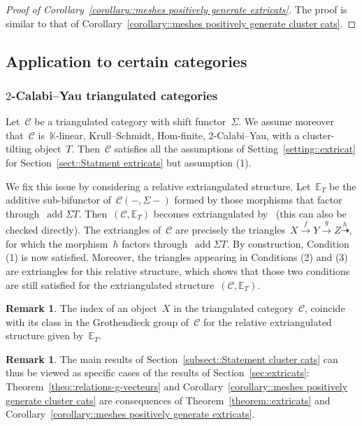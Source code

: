 \documentclass{amsart}
\theoremstyle{definition}
\newtheorem{remark}[theorem]{Remark}
\newcommand{\field}{\mathbb{K}}
\newcommand{\cat}{\mathcal{C}}
\newcommand{\susp}{\Sigma}
\newcommand{\add}{\operatorname{add}}
\begin{document}
\begin{proof}[Proof of Corollary~\ref{corollary::meshes positively generate extricats}]
The proof is similar to that of Corollary~\ref{corollary::meshes positively generate cluster cats}.
\end{proof}



\subsection{Application to certain categories}


\subsubsection{$2$-Calabi--Yau triangulated categories}
\label{sect::2CYTriangulated}

Let~$\cat$ be a triangulated category with shift functor~$\susp$.
We assume moreover that~$\cat$ is~$\field$-linear, Krull--Schmidt, Hom-finite, 2-Calabi--Yau, with a cluster-tilting object~$T$.
Then~$\cat$ satisfies all the assumptions of Setting~\ref{setting::extricat} for Section~\ref{sect::Statment extricats} but assumption (1).

We fix this issue by considering a relative extriangulated structure.
Let~$\mathbb{E}_T$ be the additive sub-bifunctor of~$\cat(-,\susp -)$ formed by those morphisms that factor through~$\add\susp T$.
Then~$(\cat,\mathbb{E}_T)$ becomes extriangulated by~\cite[Proposition 3.14]{HerschendLiuNakaoka} (this can also be checked directly).
The extriangles of~$\cat$ are precisely the triangles~$X\overset{f}{\rightarrow}Y\overset{g}{\rightarrow} Z \overset{h}{\dashrightarrow}$, for which the morphism~$h$ factors through~$\add\susp T$.
By construction, Condition (1) is now satisfied.
Moreover, the triangles appearing in Conditions (2) and (3) are extriangles for this relative structure, which shows that those two conditions are still satisfied for the extriangulated structure~$(\cat,\mathbb{E}_T)$.

\begin{remark}
The index of an object~$X$ in the triangulated category~$\cat$, coincide with its class in the Grothendieck group of~$\cat$ for the relative extriangulated structure given by~$\mathbb{E}_T$.
\end{remark}

\begin{remark}
 The main results of Section~\ref{subsect::Statement cluster cats} can thus be viewed as specific cases of the results of Section~\ref{sec:extricats}: Theorem~\ref{theo::relations-g-vecteurs} and Corollary~\ref{corollary::meshes positively generate cluster cats} are consequences of Theorem~\ref{theorem::extricats} and Corollary~\ref{corollary::meshes positively generate extricats}.
\end{remark}
\end{document}
